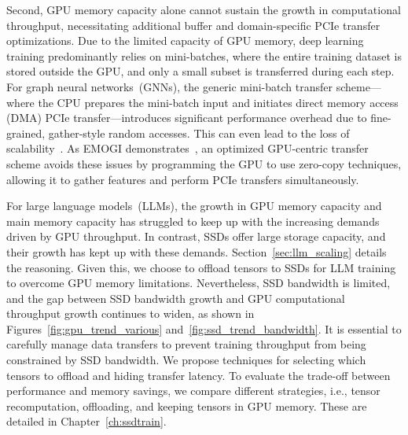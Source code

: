 Second, GPU memory capacity alone cannot sustain the growth in computational throughput, necessitating additional buffer and domain-specific PCIe transfer optimizations. Due to the limited capacity of GPU memory, deep learning training predominantly relies on mini-batches, where the entire training dataset is stored outside the GPU, and only a small subset is transferred during each step. For graph neural networks~(GNNs), the generic mini-batch transfer scheme---where the CPU prepares the mini-batch input and initiates direct memory access (DMA) PCIe transfer---introduces significant performance overhead due to fine-grained, gather-style random accesses. This can even lead to the loss of scalability~\cite{minLargeGraphConvolutional2021}. As EMOGI demonstrates~\cite{minEMOGIEfficientMemoryaccess2020,minLargeGraphConvolutional2021,minFinegrainedMemoryAccess2022}, an optimized GPU-centric transfer scheme avoids these issues by programming the GPU to use zero-copy techniques, allowing it to gather features and perform PCIe transfers simultaneously. 



For large language models~(LLMs), the growth in GPU memory capacity and main memory capacity has struggled to keep up with the increasing demands driven by GPU throughput. In contrast, SSDs offer large storage capacity, and their growth has kept up with these demands. Section~\ref{sec:llm_scaling} details the reasoning. Given this, we choose to offload tensors to SSDs for LLM training to overcome GPU memory limitations. Nevertheless, SSD bandwidth is limited, and the gap between SSD bandwidth growth and GPU computational throughput growth continues to widen, as shown in Figures~\ref{fig:gpu_trend_various} and~\ref{fig:ssd_trend_bandwidth}. It is essential to carefully manage data transfers to prevent training throughput from being constrained by SSD bandwidth. We propose techniques for selecting which tensors to offload and hiding transfer latency. To evaluate the trade-off between performance and memory savings, we compare different strategies, i.e., tensor recomputation, offloading, and keeping tensors in GPU memory. These are detailed in Chapter~\ref{ch:ssdtrain}.


